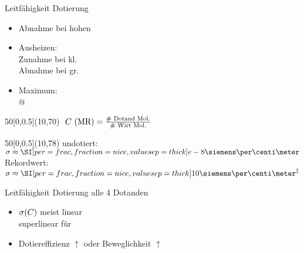 \begin{frame}{Leitfähigkeit \vs Dotierung}
{\begin{itemize}
\item <3-> Abnahme bei hohen \C
\item <4-> Ausheizen: \\Zunahme bei kl. \C \\Abnahme bei gr. \C
\item <4-> Maximum:\\ @ \C[0.045] %
\end{itemize}
}
\begin{textblock}{50}[0,0.5](10,70)%
\footnotesize
$\text{\C (MR)} = \frac{\text{\# Dotand Mol.}}{\text{\# Wirt Mol.}}$
\end{textblock}
\begin{textblock}{50}[0,0.5](10,78)%
\footnotesize
\CS undotiert: $\c\approx \Scm{e-8}$ \fnSym
\\Rekordwert: $\c\approx \Scm{10} ^{\ddagger}$
\end{textblock}
%
\end{frame}

\begin{frame}{Leitfähigkeit \vs Dotierung}%
alle 4 Dotanden%
%
{%
\begin{itemize}
\item <2-> $\c(\C)$ meist linear
\\superlinear für \dmbi
\item <2-> \Pfeil Dotiereffizienz $\uparrow$ oder Beweglichkeit $\uparrow$
\end{itemize}

}
\end{frame}

